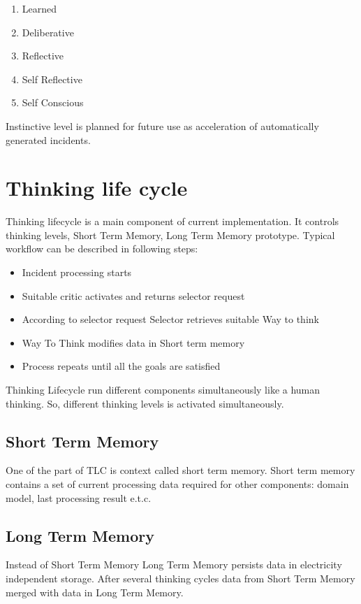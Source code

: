 \documentclass[runningheads,a4paper]{llncs}
\begin{document}
\begin{enumerate}
 \item Learned
 \item Deliberative
 \item Reflective
 \item Self Reflective
 \item Self Conscious
\end{enumerate}

  Instinctive level is planned for future use as acceleration of automatically generated incidents.

\section{Thinking life cycle}

Thinking lifecycle is a main component of current implementation. It controls thinking levels, Short Term Memory, Long Term Memory prototype. Typical workflow can be described in following steps:

\begin{itemize}
 \item Incident processing starts
 \item Suitable critic activates and returns selector request
 \item According to selector request Selector retrieves suitable Way to think
 \item Way To Think modifies data in Short term memory
 \item Process repeats until all the goals are satisfied
\end{itemize}

Thinking Lifecycle run different components simultaneously like a human thinking. So, different thinking levels is activated simultaneously.

\subsection{Short Term Memory}
One of the part of TLC is context called short term memory. Short term memory contains a set of current processing data required for other components: domain model, last processing result e.t.c.

\subsection{Long Term Memory}
Instead of Short Term Memory Long Term Memory persists data in electricity independent storage. After several thinking cycles data from Short Term Memory merged with data in Long Term Memory.
\end{document}
